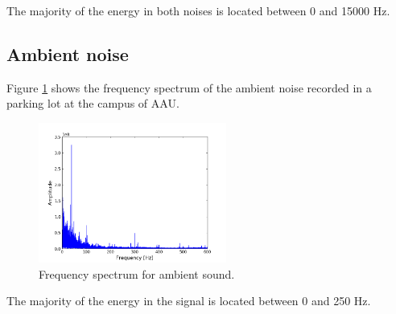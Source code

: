 The majority of the energy in both noises is located between 0 and 15000 Hz.
\newpage
\subsection{Ambient noise}
Figure \ref{fig:ambient} shows the frequency spectrum of the ambient noise recorded in a parking lot at the campus of AAU.
\begin{figure}[H]
\centering
\includegraphics[width=0.55\textwidth]{figures/freqanal/ambient.png}
\caption{Frequency spectrum for ambient sound.}
\label{fig:ambient}
\end{figure}
The majority of the energy in the signal is located between 0 and 250 Hz.











